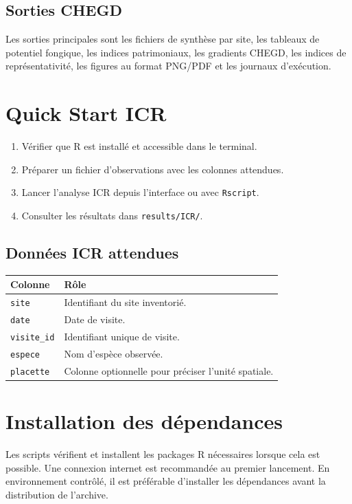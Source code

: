 \documentclass[11pt,a4paper]{article}
\begin{document}
\subsection{Sorties CHEGD}

Les sorties principales sont les fichiers de synthèse par site, les tableaux de potentiel
fongique, les indices patrimoniaux, les gradients CHEGD, les indices de représentativité,
les figures au format PNG/PDF et les journaux d'exécution.

\section{Quick Start ICR}

\begin{enumerate}
  \item Vérifier que R est installé et accessible dans le terminal.
  \item Préparer un fichier d'observations avec les colonnes attendues.
  \item Lancer l'analyse ICR depuis l'interface ou avec \texttt{Rscript}.
  \item Consulter les résultats dans \texttt{results/ICR/}.
\end{enumerate}

\subsection{Données ICR attendues}

\begin{tabularx}{\textwidth}{lX}
\toprule
\textbf{Colonne} & \textbf{Rôle} \\
\midrule
\texttt{site} & Identifiant du site inventorié. \\
\texttt{date} & Date de visite. \\
\texttt{visite\_id} & Identifiant unique de visite. \\
\texttt{espece} & Nom d'espèce observée. \\
\texttt{placette} & Colonne optionnelle pour préciser l'unité spatiale. \\
\bottomrule
\end{tabularx}

\section{Installation des dépendances}

Les scripts vérifient et installent les packages R nécessaires lorsque cela est possible.
Une connexion internet est recommandée au premier lancement. En environnement contrôlé,
il est préférable d'installer les dépendances avant la distribution de l'archive.
\end{document}
